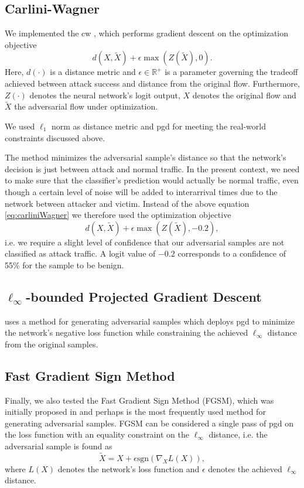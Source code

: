 \documentclass[conference]{IEEEtran}
\begin{document}
\subsection{Carlini-Wagner}
We implemented the \gls{cw} \cite{carlini_towards_2017}, which performs gradient descent on the optimization objective
\begin{equation} \label{eq:carliniWagner}
d(X,\tilde X) + \epsilon  \max(Z(\tilde X), 0).
\end{equation}
Here, $d(\cdot)$ is a distance metric and $\epsilon \in \mathbb R^+$ is a parameter governing the tradeoff achieved between attack success and distance from the original flow. Furthermore, $Z(\cdot)$ denotes the neural network's logit output, $X$ denotes the original flow and $\tilde X$ the adversarial flow under optimization.

We used $\ell_1$ norm as distance metric and \gls{pgd} for meeting the real-world constraints discussed above.

The method minimizes the adversarial sample's distance so that the network's decision is just between attack and normal traffic. In the present context, we need to make sure that the classifier's prediction would actually be normal traffic, even though a certain level of noise will be added to interarrival times due to the network between attacker and victim. Instead of the above equation \ref{eq:carliniWagner} we therefore used the optimization objective
\begin{equation}
d(X,\tilde X) + \epsilon  \max(Z(\tilde X), -0.2),
\end{equation}
i.e. we require a slight level of confidence that our adversarial samples are not classified as attack traffic. A logit value of $-0.2$ corresponds to a confidence of 55\% for the sample to be benign.

\subsection{$\ell_\infty$-bounded Projected Gradient Descent}
\cite{madry_towards_2018} uses a method for generating adversarial samples which deploys \gls{pgd}  to minimize the network's negative loss function while constraining the achieved $\ell_\infty$ distance from the original samples.

\subsection{Fast Gradient Sign Method}
Finally, we also tested the Fast Gradient Sign Method (FGSM), which was initially proposed in \cite{goodfellow_explaining_2015} and perhaps is the most frequently used method for generating adversarial samples. FGSM can be considered a single pass of \gls{pgd} on the loss function with an equality constraint on the $\ell_\infty$ distance, i.e. the adversarial sample is found as
\begin{equation}
\tilde X = X + \epsilon \text{sgn}( \nabla_X L(X)),
\end{equation}
where $L(X)$ denotes the network's loss function and $\epsilon$ denotes the achieved $\ell_\infty$ distance.
\end{document}
